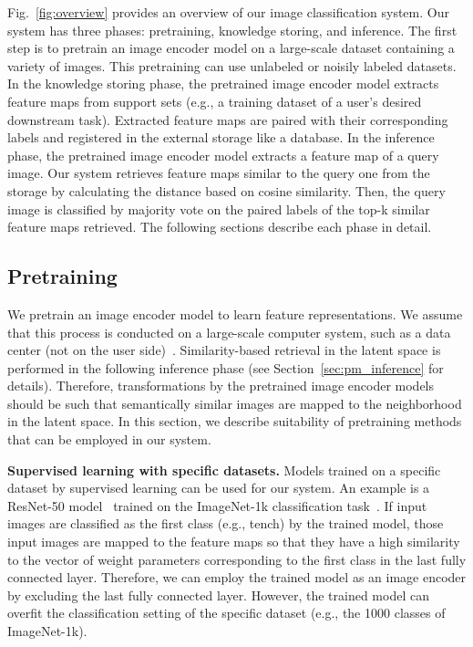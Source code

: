 \documentclass[runningheads]{llncs}
\begin{document}
Fig.~\ref{fig:overview} provides an overview of our image classification system.
Our system has three phases: pretraining, knowledge storing, and inference.
The first step is to pretrain an image encoder model on a large-scale dataset containing a variety of images.
This pretraining can use unlabeled or noisily labeled datasets.
In the knowledge storing phase, the pretrained image encoder model extracts feature maps
from support sets (e.g., a training dataset of a user's desired downstream task).
Extracted feature maps are paired with their corresponding labels and registered in the external storage like a database.
In the inference phase, the pretrained image encoder model extracts a feature map of a query image.
Our system retrieves feature maps similar to the query one from the storage by calculating the distance based on cosine similarity.
Then, the query image is classified by majority vote on the paired labels of the top-k similar feature maps retrieved.
The following sections describe each phase in detail.


\subsection{Pretraining}
\label{sec:pm_pretraining}

We pretrain an image encoder model to learn feature representations.
We assume that this process is conducted on a large-scale computer system, such as a data center (not on the user side)~\cite{foundation_model}.
Similarity-based retrieval in the latent space is performed in the following inference phase (see Section~\ref{sec:pm_inference} for details).
Therefore, transformations by the pretrained image encoder models should be such that semantically similar images are mapped to the neighborhood in the latent space.
In this section, we describe suitability of pretraining methods that can be employed in our system.


\noindent
\textbf{Supervised learning with specific datasets.}
Models trained on a specific dataset by supervised learning can be used for our system. An example is a ResNet-50 model~\cite{ResNet} trained on the ImageNet-1k classification task~\cite{ImageNet}.
If input images are classified as the first class (e.g., tench) by the trained model, those input images are mapped to the feature maps so that
they have a high similarity to the vector of weight parameters corresponding to the first class in the last fully connected layer.
Therefore, we can employ the trained model as an image encoder by excluding the last fully connected layer.
However, the trained model can overfit the classification setting of the specific dataset (e.g., the 1000 classes of ImageNet-1k). 
\end{document}
